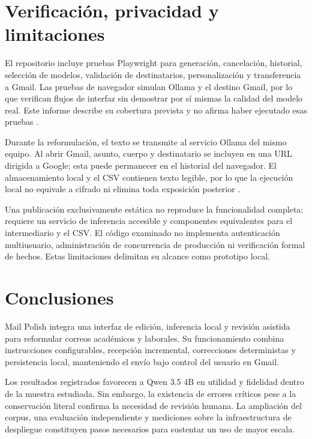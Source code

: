 \documentclass[conference]{IEEEtran}
\begin{document}
\section{Verificación, privacidad y limitaciones}
El repositorio incluye pruebas Playwright para generación, cancelación, historial, selección de modelos, validación de destinatarios, personalización y transferencia a Gmail. Las pruebas de navegador simulan Ollama y el destino Gmail, por lo que verifican flujos de interfaz sin demostrar por sí mismas la calidad del modelo real. Este informe describe su cobertura prevista y no afirma haber ejecutado esas pruebas \cite{tests}.

Durante la reformulación, el texto se transmite al servicio Ollama del mismo equipo. Al abrir Gmail, asunto, cuerpo y destinatario se incluyen en una URL dirigida a Google; esta puede permanecer en el historial del navegador. El almacenamiento local y el CSV contienen texto legible, por lo que la ejecución local no equivale a cifrado ni elimina toda exposición posterior \cite{readme}.

Una publicación exclusivamente estática no reproduce la funcionalidad completa: requiere un servicio de inferencia accesible y componentes equivalentes para el intermediario y el CSV. El código examinado no implementa autenticación multiusuario, administración de concurrencia de producción ni verificación formal de hechos. Estas limitaciones delimitan su alcance como prototipo local.

\section{Conclusiones}
Mail Polish integra una interfaz de edición, inferencia local y revisión asistida para reformular correos académicos y laborales. Su funcionamiento combina instrucciones configurables, recepción incremental, correcciones deterministas y persistencia local, manteniendo el envío bajo control del usuario en Gmail.

Los resultados registrados favorecen a Qwen 3.5 4B en utilidad y fidelidad dentro de la muestra estudiada. Sin embargo, la existencia de errores críticos pese a la conservación literal confirma la necesidad de revisión humana. La ampliación del corpus, una evaluación independiente y mediciones sobre la infraestructura de despliegue constituyen pasos necesarios para sustentar un uso de mayor escala.
\end{document}
